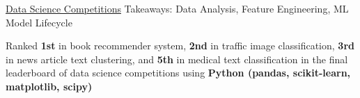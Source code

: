 \begin{cventries}

  \cventryprojects
    {\href{https://github.com/k-chuang/data-science-competitions}{Data Science Competitions}} %
    {Takeaways: Data Analysis, Feature Engineering, ML Model Lifecycle} %
    {
      \begin{cvitems} %
        \item {Ranked \textbf{1st} in book recommender system, \textbf{2nd} in traffic image classification, \textbf{3rd} in news article text clustering, and \textbf{5th} in medical text classification in the final leaderboard of data science competitions using \textbf{Python (pandas, scikit-learn, matplotlib, scipy)}}
      \end{cvitems}
    }


\end{cventries}
